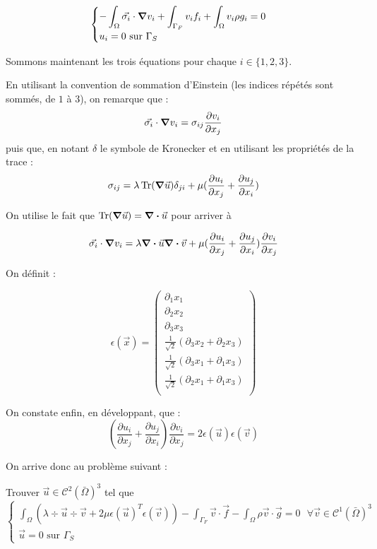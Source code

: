 \begin{equation}
    \begin{cases}
        -\displaystyle\int_{\Omega} \vec{\sigma_i} \cdot \grad v_i + \int_{\Gamma_F} v_i f_i + \int_\Omega v_i \rho g_i = 0\\
        u_i = 0 \textrm{ sur } \Gamma_S
    \end{cases}
\end{equation}

Sommons maintenant les trois équations pour chaque $i \in \{1,2,3\}$.

En utilisant la convention de sommation d'Einstein (les indices répétés sont sommés, de $1$ à $3$), on remarque que :
$$
\vec{\sigma_i} \cdot \grad v_i = \sigma_{ij} \frac{\partial v_i}{\partial x_j}
$$
puis que, en notant $\delta$ le symbole de Kronecker et en utilisant les propriétés de la trace :
$$
\sigma_{ij} = \lambda \operatorname{Tr}(\grad \vec{u}) \delta_{ji} + \mu (\frac{\partial u_i}{\partial x_j} + \frac{\partial u_j}{\partial x_i})
$$

On utilise le fait que $\operatorname{Tr}(\grad \vec{u}) = \div \vec{u}$ pour arriver à 

$$
\vec{\sigma_i} \cdot \grad v_i = \lambda \div \vec{u} \div \vec{v} + \mu (\frac{\partial u_i}{\partial x_j} + \frac{\partial u_j}{\partial x_i})\frac{\partial v_i}{\partial x_j}
$$

On définit :

$$
\epsilon(\vec{x})=
\begin{pmatrix}
    \partial_1 x_1\\
    \partial_2 x_2\\ 
    \partial_3 x_3\\
    \frac{1}{\sqrt{2}}(\partial_3 x_2 + \partial_2 x_3)\\
    \frac{1}{\sqrt{2}}(\partial_3 x_1 + \partial_1 x_3)\\
    \frac{1}{\sqrt{2}}(\partial_2 x_1 + \partial_1 x_3)\\
\end{pmatrix}
$$

On constate enfin, en développant, que :
$$
(\frac{\partial u_i}{\partial x_j} + \frac{\partial u_j}{\partial x_i})\frac{\partial v_i}{\partial x_j} = 2\epsilon(\vec{u})\epsilon(\vec{v})
$$

On arrive donc au problème suivant  :

Trouver $\vec{u} \in \mathcal{C}^2(\bar{\Omega})^3$ tel que
\begin{equation}\label{varia}
    \begin{cases}
        \displaystyle\int_{\Omega} (\lambda \div \vec{u} \div \vec{v} + 2\mu \epsilon(\vec{u})^T \epsilon(\vec{v})) - \int_{\Gamma_F} \vec{v} \cdot \vec{f} - \int_\Omega \rho \vec{v} \cdot \vec{g} = 0 \textrm{ } \forall \vec{v} \in \mathcal{C}^1(\bar{\Omega})^3\\
        \vec{u} = 0 \textrm{ sur } \Gamma_S
    \end{cases}
\end{equation}

